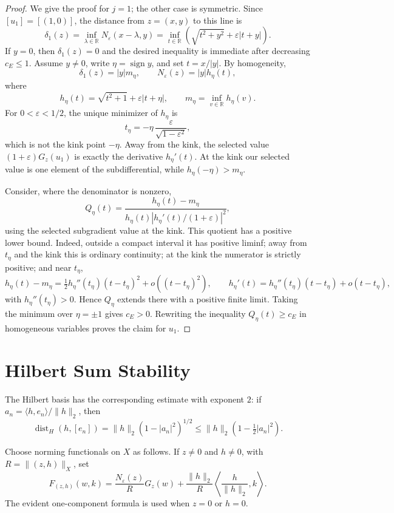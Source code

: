 \documentclass[11pt]{amsart}
\newcommand{\dist}{\operatorname{dist}}
\newcommand{\R}{\mathbb R}
\begin{document}
\begin{proof}
We give the proof for \(j=1\); the other case is symmetric. Since
\([u_1]=[(1,0)]\), the distance from \(z=(x,y)\) to this line is
\[
  \delta_1(z)=\inf_{\lambda\in\R} N_\varepsilon(x-\lambda,y)
  =\inf_{t\in\R}\left(\sqrt{t^2+y^2}+\varepsilon |t+y|\right).
\]
If \(y=0\), then \(\delta_1(z)=0\) and the desired inequality is immediate
after decreasing \(c_E\leq1\). Assume \(y\neq0\), write
\(\eta=\operatorname{sign} y\), and set \(t=x/|y|\). By homogeneity,
\[
  \delta_1(z)=|y|m_\eta,\qquad
  N_\varepsilon(z)=|y|h_\eta(t),
\]
where
\[
  h_\eta(t)=\sqrt{t^2+1}+\varepsilon |t+\eta|,\qquad
  m_\eta=\inf_{v\in\R} h_\eta(v).
\]
For \(0<\varepsilon<1/2\), the unique minimizer of \(h_\eta\) is
\[
  t_\eta=-\eta\,\frac{\varepsilon}{\sqrt{1-\varepsilon^2}},
\]
which is not the kink point \(-\eta\). Away from the kink, the selected value
\((1+\varepsilon)G_z(u_1)\) is exactly the derivative \(h_\eta'(t)\). At the
kink our selected value is one element of the subdifferential, while
\(h_\eta(-\eta)>m_\eta\).

Consider, where the denominator is nonzero,
\[
  Q_\eta(t)=
  \frac{h_\eta(t)-m_\eta}
       {h_\eta(t)\left|h_\eta'(t)/(1+\varepsilon)\right|^2},
\]
using the selected subgradient value at the kink. This quotient has a positive
lower bound. Indeed, outside a compact interval it has positive liminf; away
from \(t_\eta\) and the kink this is ordinary continuity; at the kink the
numerator is strictly positive; and near \(t_\eta\),
\[
  h_\eta(t)-m_\eta
    =\tfrac12 h_\eta''(t_\eta)(t-t_\eta)^2+o((t-t_\eta)^2),\qquad
  h_\eta'(t)=h_\eta''(t_\eta)(t-t_\eta)+o(t-t_\eta),
\]
with \(h_\eta''(t_\eta)>0\). Hence \(Q_\eta\) extends there with a positive
finite limit. Taking the minimum over \(\eta=\pm1\) gives \(c_E>0\). Rewriting
the inequality \(Q_\eta(t)\geq c_E\) in homogeneous variables proves the
claim for \(u_1\).
\end{proof}

\section*{Hilbert Sum Stability}

The Hilbert basis has the corresponding estimate with exponent \(2\): if
\(a_n=\langle h,e_n\rangle/\|h\|_2\), then
\[
  \dist_H(h,[e_n])
  =\|h\|_2(1-|a_n|^2)^{1/2}
  \leq \|h\|_2(1-\tfrac12 |a_n|^2).
\]

Choose norming functionals on \(X\) as follows. If \(z\neq0\) and \(h\neq0\),
with \(R=\|(z,h)\|_X\), set
\[
  F_{(z,h)}(w,k)=
  \frac{N_\varepsilon(z)}{R}G_z(w)
  +\frac{\|h\|_2}{R}\left\langle \frac{h}{\|h\|_2},k\right\rangle.
\]
The evident one-component formula is used when \(z=0\) or \(h=0\).
\end{document}
